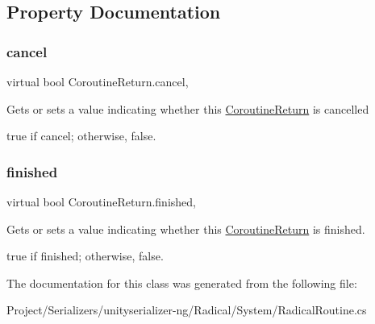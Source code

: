 \subsection{Property Documentation}
\mbox{\label{class_coroutine_return_ac68a21bc01c95f3fa3a8ab5202cada18}} 
\subsubsection{\texorpdfstring{cancel}{cancel}}
{\footnotesize\ttfamily virtual bool Coroutine\+Return.\+cancel\hspace{0.3cm}{\ttfamily [get]}, {\ttfamily [set]}}



Gets or sets a value indicating whether this \hyperlink{class_coroutine_return}{Coroutine\+Return} is cancelled 

{\ttfamily true} if cancel; otherwise, {\ttfamily false}. \mbox{\label{class_coroutine_return_a6498bd9490d9514b662431ee9002a1a1}} 
\subsubsection{\texorpdfstring{finished}{finished}}
{\footnotesize\ttfamily virtual bool Coroutine\+Return.\+finished\hspace{0.3cm}{\ttfamily [get]}, {\ttfamily [set]}}



Gets or sets a value indicating whether this \hyperlink{class_coroutine_return}{Coroutine\+Return} is finished. 

{\ttfamily true} if finished; otherwise, {\ttfamily false}. 

The documentation for this class was generated from the following file\+:\begin{DoxyCompactItemize}
\item 
Project/\+Serializers/unityserializer-\/ng/\+Radical/\+System/Radical\+Routine.\+cs\end{DoxyCompactItemize}
